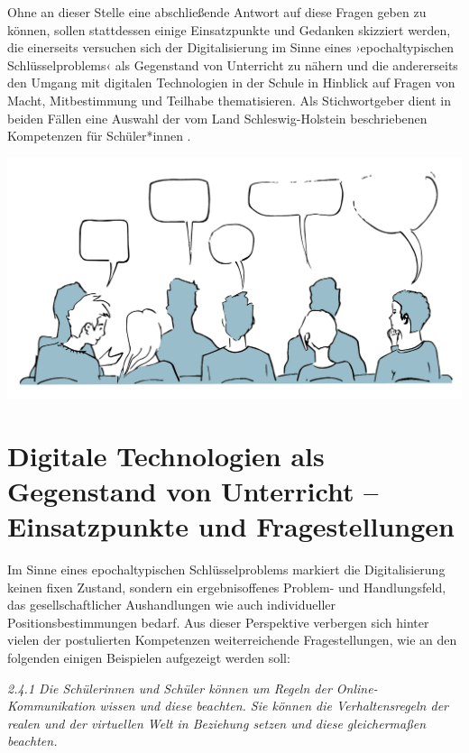 \documentclass[
  a4paper,
]{book}
\begin{document}
Ohne an dieser Stelle eine abschließende Antwort auf diese Fragen geben zu können, sollen stattdessen einige Einsatzpunkte und Gedanken skizziert werden, die einerseits versuchen sich der Digitalisierung im Sinne eines ›epochaltypischen Schlüsselproblems‹ \citep{klafkiNeueStudienZur2007} als Gegenstand von Unterricht zu nähern und die andererseits den Umgang mit digitalen Technologien in der Schule in Hinblick auf Fragen von Macht, Mitbestimmung und Teilhabe thematisieren. Als Stichwortgeber dient in beiden Fällen eine Auswahl der vom Land Schleswig-Holstein beschriebenen Kompetenzen für Schüler*innen \citep{ministeriumfurbildungwissenschaftundkulturdeslandesschleswig-holsteinErganzungenFachanforderungenMedienkompetenz2018}.

\begin{center}\includegraphics{Figures/14-01-Deliberation} \end{center}

\section{Digitale Technologien als Gegenstand von Unterricht -- Einsatzpunkte und Fragestellungen}\label{digitale-technologien-als-gegenstand-von-unterricht-einsatzpunkte-und-fragestellungen}

Im Sinne eines epochaltypischen Schlüsselproblems markiert die Digitalisierung keinen fixen Zustand, sondern ein ergebnisoffenes Problem- und Handlungsfeld, das gesellschaftlicher Aushandlungen wie auch individueller Positionsbestimmungen bedarf. Aus dieser Perspektive verbergen sich hinter vielen der postulierten Kompetenzen weiterreichende Fragestellungen, wie an den folgenden einigen Beispielen aufgezeigt werden soll:

{\emph{2.4.1 Die Schülerinnen und Schüler können um Regeln der Online-Kommunikation wissen und diese beachten. Sie können die Verhaltensregeln der realen und der virtuellen Welt in Beziehung setzen und diese gleichermaßen beachten.}}
\end{document}
